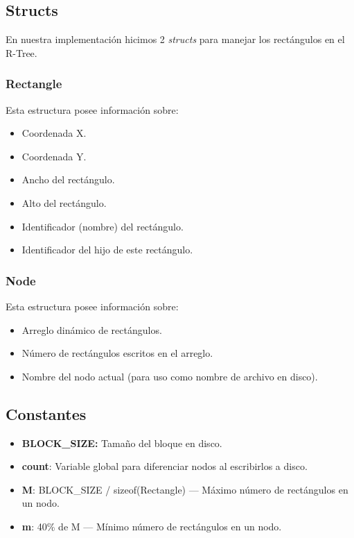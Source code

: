 \documentclass[letterpaper,10pt]{article}
\begin{document}
	\subsection{Structs}

	En nuestra implementación hicimos 2 \textit{structs} para manejar los rectángulos en el R-Tree.

	\subsubsection{Rectangle}

	Esta estructura posee información sobre:
	\begin{itemize}
		\item Coordenada X.
		\item Coordenada Y.
		\item Ancho del rectángulo.
		\item Alto del rectángulo.
		\item Identificador (nombre) del rectángulo.
		\item Identificador del hijo de este rectángulo.
	\end{itemize}

	\subsubsection{Node}

	Esta estructura posee información sobre:
	\begin{itemize}
		\item Arreglo dinámico de rectángulos.
		\item Número de rectángulos escritos en el arreglo.
		\item Nombre del nodo actual (para uso como nombre de archivo en disco).
	\end{itemize}

	\subsection{Constantes}

	\begin{itemize}
		\item \textbf{BLOCK\_SIZE:} Tamaño del bloque en disco.
		\item \textbf{count}: Variable global para diferenciar nodos al escribirlos a disco.
		\item \textbf{M}: BLOCK\_SIZE / sizeof(Rectangle) --- Máximo número de rectángulos en un nodo.
		\item \textbf{m}: 40\% de M --- Mínimo número de rectángulos en un nodo.
	\end{itemize}
\end{document}
